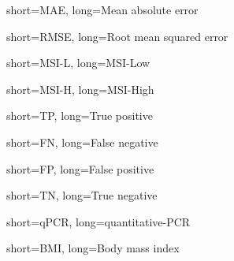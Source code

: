 {
    short=MAE,
    long=Mean absolute error
}

{
    short=RMSE,
    long=Root mean squared error
}

{
    short=MSI-L,
    long=MSI-Low
}

{
    short=MSI-H,
    long=MSI-High
}

{
    short=TP,
    long=True positive
}

{
    short=FN,
    long=False negative
}

{
    short=FP,
    long=False positive
}

{
    short=TN,
    long=True negative
}

{
    short=qPCR,
    long=quantitative-PCR
}

{
    short=BMI,
    long=Body mass index
}
